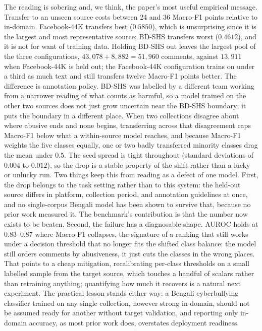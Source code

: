 \documentclass[11pt,a4paper]{article}
\def\emph#1{#1}%
\begin{document}
The reading is sobering and, we think, the paper's most useful empirical message. Transfer to an unseen source costs between 24 and 36 Macro-F1 points relative to in-domain. Facebook-44K transfers best ($0.5850$), which is unsurprising since it is the largest and most representative source; BD-SHS transfers worst ($0.4612$), and it is not for want of training data. Holding BD-SHS out leaves the \emph{largest} pool of the three configurations, $43{,}078 + 8{,}882 = 51{,}960$ comments, against $13{,}911$ when Facebook-44K is held out; the Facebook-44K configuration trains on under a third as much text and still transfers twelve Macro-F1 points better. The difference is annotation policy. BD-SHS was labelled by a different team working from a narrower reading of what counts as harmful, so a model trained on the other two sources does not just grow uncertain near the BD-SHS boundary; it puts the boundary in a different place. When two collections disagree about where \emph{abusive} ends and \emph{none} begins, transferring across that disagreement caps Macro-F1 below what a within-source model reaches, and because Macro-F1 weights the five classes equally, one or two badly transferred minority classes drag the mean under $0.5$. The seed spread is tight throughout (standard deviations of $0.004$ to $0.012$), so the drop is a stable property of the shift rather than a lucky or unlucky run. Two things keep this from reading as a defect of one model. First, the drop belongs to the task setting rather than to this system: the held-out source differs in platform, collection period, and annotation guidelines at once, and no single-corpus Bengali model has been shown to survive that, because no prior work measured it. The benchmark's contribution is that the number now exists to be beaten. Second, the failure has a diagnosable shape. AUROC holds at 0.83--0.87 where Macro-F1 collapses, the signature of a ranking that still works under a decision threshold that no longer fits the shifted class balance: the model still orders comments by abusiveness, it just cuts the classes in the wrong places. That points to a cheap mitigation, recalibrating per-class thresholds on a small labelled sample from the target source, which touches a handful of scalars rather than retraining anything; quantifying how much it recovers is a natural next experiment. The practical lesson stands either way: a Bengali cyberbullying classifier trained on any single collection, however strong in-domain, should not be assumed ready for another without target validation, and reporting only in-domain accuracy, as most prior work does, overstates deployment readiness.
\end{document}
